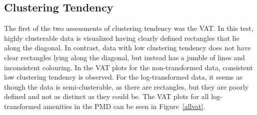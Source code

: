 \documentclass[11pt, a4paper]{article}
\begin{document}
\begin{table}[h]
\centering
\caption[Number of outliers]{The number of outliers in each amenity in the PMD before and after log-transformation.}\label{outliercounts}
\end{table}









\subsection{Clustering Tendency}


The first of the two assessments of clustering tendency was the VAT. In this test, highly clusterable data is visualized having clearly defined rectangles that lie along the diagonal. In contrast, data with low clustering tendency does not have clear rectangles lying along the diagonal, but instead has a jumble of lines and inconsistent colouring. In the VAT plots for the non-transformed data, consistent low clustering tendency is observed. For the log-transformed data, it seems as though the data is semi-clusterable, as there are rectangles, but they are poorly defined and not as distinct as they could be. The VAT plots for all log-transformed amenities in the PMD can be seen in Figure~\ref{allvat}.
\end{document}
